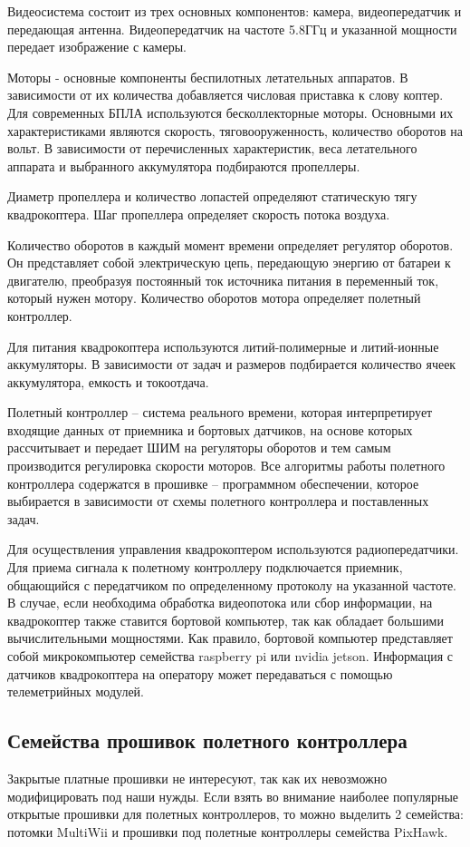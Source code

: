 Видеосистема состоит из трех основных компонентов: камера, видеопередатчик и передающая антенна. Видеопередатчик на частоте 5.8ГГц и указанной мощности передает изображение с камеры.

Моторы - основные компоненты беспилотных летательных аппаратов. В зависимости от их количества добавляется числовая приставка к слову коптер. Для современных БПЛА используются бесколлекторные моторы. Основными их характеристиками являются скорость, тяговооруженность, количество оборотов на вольт. В зависимости от перечисленных характеристик, веса летательного аппарата и выбранного аккумулятора подбираются пропеллеры.

Диаметр пропеллера и количество лопастей определяют статическую тягу квадрокоптера. Шаг пропеллера определяет скорость потока воздуха.

Количество оборотов в каждый момент времени определяет регулятор оборотов. Он представляет собой электрическую цепь, передающую энергию от батареи к двигателю, преобразуя постоянный ток источника питания в переменный ток, который нужен мотору. Количество оборотов мотора определяет полетный контроллер.

Для питания квадрокоптера используются литий-полимерные и литий-ионные аккумуляторы. В зависимости от задач и размеров подбирается количество ячеек аккумулятора, емкость и токоотдача.

Полетный контроллер -- система реального времени, которая интерпретирует входящие данных от приемника и бортовых датчиков, на основе которых рассчитывает и передает ШИМ на регуляторы оборотов и тем самым производится регулировка скорости моторов. Все алгоритмы работы полетного контроллера содержатся в прошивке -- программном обеспечении, которое выбирается в зависимости от схемы полетного контроллера и поставленных задач.

Для осуществления управления квадрокоптером используются радиопередатчики. Для приема сигнала к полетному контроллеру подключается приемник, общающийся с передатчиком по определенному протоколу на указанной частоте. В случае, если необходима обработка видеопотока или сбор информации, на квадрокоптер также ставится бортовой компьютер, так как обладает большими вычислительными мощностями. Как правило, бортовой компьютер представляет собой микрокомпьютер семейства raspberry pi или nvidia jetson. Информация с датчиков квадрокоптера на оператору может передаваться с помощью телеметрийных модулей.

\subsection{Семейства прошивок полетного контроллера}
Закрытые платные прошивки не интересуют, так как их невозможно модифицировать под наши нужды. Если взять во внимание наиболее популярные открытые прошивки для полетных контроллеров, то можно выделить 2 семейства: потомки MultiWii и прошивки под полетные контроллеры семейства PixHawk.

